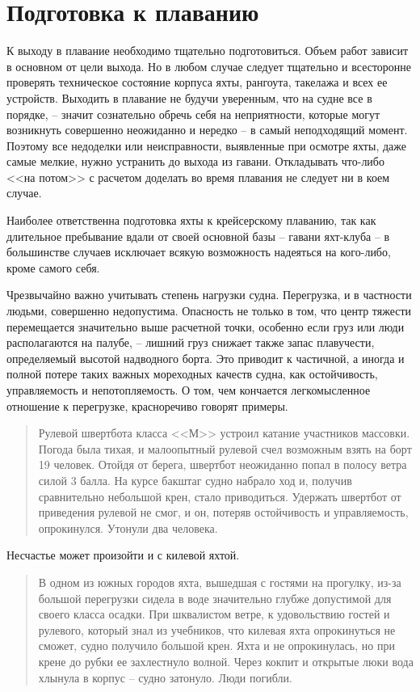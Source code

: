 \documentclass[a4paper, 12pt, twoside, final]{scrbook}
\begin{document}
\section{Подготовка к плаванию}

К выходу в плавание необходимо тщательно подготовиться. Объем работ зависит в основном от цели выхода. Но в любом случае следует тщательно и всесторонне проверять техническое состояние корпуса яхты, рангоута, такелажа и всех ее устройств. Выходить в плавание не будучи уверенным, что на судне все в порядке, \--- значит сознательно обречь себя на неприятности, которые могут возникнуть совершенно неожиданно и нередко \--- в самый неподходящий момент. Поэтому все недоделки или неисправности, выявленные при осмотре яхты, даже самые мелкие, нужно устранить до выхода из гавани. Откладывать что-либо <<на потом>> с расчетом доделать во время плавания не следует ни в коем случае.

Наиболее ответственна подготовка яхты к крейсерскому плаванию, так как длительное пребывание вдали от своей основной базы \--- гавани яхт-клуба \--- в большинстве случаев исключает всякую возможность надеяться на кого-либо, кроме самого себя.

Чрезвычайно важно учитывать степень нагрузки судна. Перегрузка, и в частности людьми, совершенно недопустима. Опасность не только в том, что центр тяжести перемещается значительно выше расчетной точки, особенно если груз или люди располагаются на палубе, \--- лишний груз снижает также запас плавучести, определяемый высотой надводного борта. Это приводит к частичной, а иногда и полной потере таких важных мореходных качеств судна, как остойчивость, управляемость и непотопляемость. О том, чем кончается легкомысленное отношение к перегрузке, красноречиво говорят примеры.

\begin{quote}
Рулевой швертбота класса <<М>> устроил катание участников массовки. Погода была тихая, и малоопытный рулевой счел возможным взять на борт 19 человек. Отойдя от берега, швертбот неожиданно попал в полосу ветра силой 3 балла. На курсе бакштаг судно набрало ход и, получив сравнительно небольшой крен, стало приводиться. Удержать швертбот от приведения рулевой не смог, и он, потеряв остойчивость и управляемость, опрокинулся. Утонули два человека.
\end{quote}

Несчастье может произойти и с килевой яхтой.

\begin{quote}
В одном из южных городов яхта, вышедшая с гостями на прогулку, из-за большой перегрузки сидела в воде значительно глубже допустимой для своего класса осадки. При шквалистом ветре, к удовольствию гостей и рулевого, который знал из учебников, что килевая яхта опрокинуться не сможет, судно получило большой крен. Яхта и не опрокинулась, но при крене до рубки ее захлестнуло волной. Через кокпит и открытые люки вода хлынула в корпус \--- судно затонуло. Люди погибли.
\end{quote}
\end{document}
